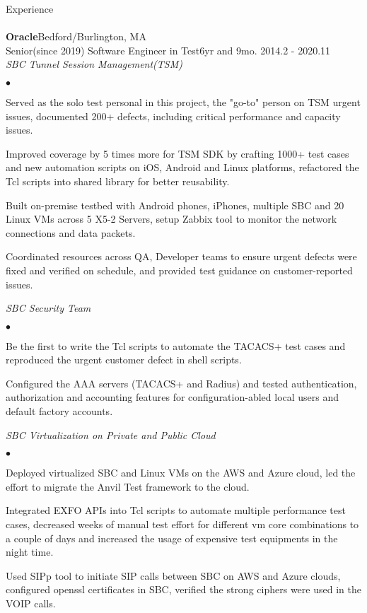 \documentclass[10pt]{article}
\newcommand{\lineunder}{\vspace*{-8pt}\\\hspace*{-18pt}\hrulefill\\}
\newcommand{\header}[1]{{\hspace*{-15pt}\vspace*{6pt}\large{{#1}}}\vspace*{-6pt}\lineunder}
\newcommand{\company}[5]{
    \large{\textbf{#1}}\hfill \small{#3}\\
    #2\hfill \small{#4}\small{#5}\\
}
\newcommand{\project}[1]{\checkmark\normalsize{{\emph{#1}}}\\}
\newenvironment{achievements}
    {\begin{list}
        {$\bullet$}{\topsep 0pt \itemsep -1pt}} 
    {\end{list}}
\begin{document}
\header{Experience}


\company{Oracle}{Senior(since 2019) Software Engineer in Test}{Bedford/Burlington, MA}{6yr and 9mo. }{2014.2 - 2020.11}

\project{SBC Tunnel Session Management(TSM)}
  \begin{achievements}
\item Served as the solo test personal in this project, the "go-to" person on TSM urgent issues, documented 200+ defects, including critical performance and capacity issues.
\item Improved coverage by 5 times more for TSM SDK by crafting 1000+ test cases and new automation scripts on iOS, Android and Linux platforms, refactored the Tcl scripts into shared library for better reusability.
\item Built on-premise testbed with Android phones, iPhones, multiple SBC and 20 Linux VMs across 5 X5-2 Servers, setup Zabbix tool to monitor the network connections and data packets.
\item Coordinated resources across QA, Developer teams to ensure urgent defects were fixed and verified on schedule, and provided test guidance on customer-reported issues.
  \end{achievements}


\project{SBC Security Team}
  \begin{achievements}
\item Be the first to write the Tcl scripts to automate the TACACS+ test cases and reproduced the urgent customer defect in shell scripts.
\item Configured the AAA servers (TACACS+ and Radius) and tested authentication, authorization and accounting features for configuration-abled local users and default factory accounts.
  \end{achievements}


\project{SBC Virtualization on Private and Public Cloud}
  \begin{achievements}
\item Deployed virtualized SBC and Linux VMs on the AWS and Azure cloud, led the effort to migrate the Anvil Test framework to the cloud.
\item Integrated EXFO APIs into Tcl scripts to automate multiple performance test cases, decreased weeks of manual test effort for different vm core combinations to a couple of days and increased the usage of expensive test equipments in the night time.
\item Used SIPp tool to initiate SIP calls between SBC on AWS and Azure clouds, configured openssl certificates in SBC, verified the strong ciphers were used in the VOIP calls.
  \end{achievements}
\end{document}
